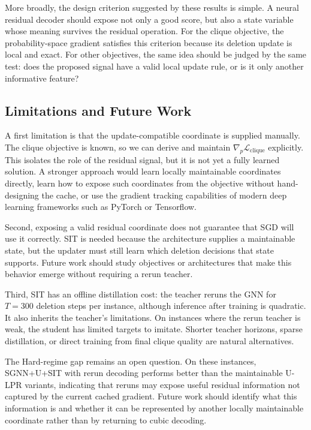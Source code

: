 \documentclass[mathematics,article,submit,pdftex,moreauthors]{Definitions/mdpi}
\begin{document}
More broadly, the design criterion suggested by these results is simple. A neural
residual decoder should expose not only a good score, but also a state variable whose
meaning survives the residual operation. For the clique objective, the
probability-space gradient satisfies this criterion because its deletion update is
local and exact. For other objectives, the same idea should be judged by the same
test: does the proposed signal have a valid local update rule, or is it only another
informative feature?

\subsection{Limitations and Future Work}

A first limitation is that the update-compatible coordinate is supplied manually. The
clique objective is known, so we can derive and maintain
$\nabla_p\mathcal{L}_{\mathrm{clique}}$ explicitly. This isolates the role of the
residual signal, but it is not yet a fully learned solution. A stronger approach
would learn locally maintainable coordinates directly, learn how to expose such
coordinates from the objective without hand-designing the cache, or use the gradient tracking capabilities of modern deep learning frameworks such as PyTorch or Tensorflow.

Second, exposing a valid residual coordinate does not guarantee that SGD will use it
correctly. SIT is needed because the architecture supplies a maintainable state, but
the updater must still learn which deletion decisions that state supports. Future
work should study objectives or architectures that make this behavior emerge without
requiring a rerun teacher.

Third, SIT has an offline distillation cost: the teacher reruns the GNN for $T=300$
deletion steps per instance, although inference after training is quadratic. It also
inherits the teacher's limitations. On instances where the rerun teacher is weak, the
student has limited targets to imitate. Shorter teacher horizons, sparse
distillation, or direct training from final clique quality are natural alternatives.

The Hard-regime gap remains an open question. On these instances,
\textsc{SGNN+U}+SIT with rerun decoding performs better than the maintainable
U-LPR variants, indicating that reruns may expose useful residual information not
captured by the current cached gradient. Future work should identify what this
information is and whether it can be represented by another locally maintainable
coordinate rather than by returning to cubic decoding.
\end{document}
